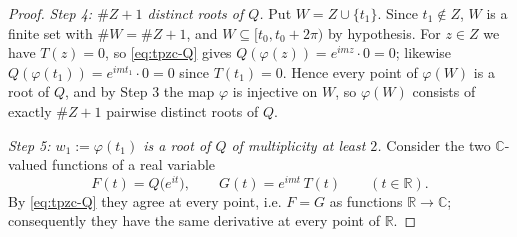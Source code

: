 \begin{proof}
\emph{Step 4: $\#Z+1$ distinct roots of $Q$.} Put $W=Z\cup\{t_1\}$. Since
$t_1\notin Z$, $W$ is a finite set with $\#W=\#Z+1$, and
$W\subseteq[t_0,t_0+2\pi)$ by hypothesis. For $z\in Z$ we have $T(z)=0$, so
\eqref{eq:tpzc-Q} gives $Q(\varphi(z))=e^{imz}\cdot0=0$; likewise
$Q(\varphi(t_1))=e^{imt_1}\cdot0=0$ since $T(t_1)=0$. Hence every point of
$\varphi(W)$ is a root of $Q$, and by Step 3 the map $\varphi$ is injective on
$W$, so $\varphi(W)$ consists of exactly $\#Z+1$ pairwise distinct roots of $Q$.

\emph{Step 5: $w_1:=\varphi(t_1)$ is a root of $Q$ of multiplicity at least
$2$.} Consider the two $\mathbb{C}$-valued functions of a real variable
\[
  F(t)=Q\bigl(e^{it}\bigr),\qquad G(t)=e^{imt}\,T(t)\qquad(t\in\mathbb{R}).
\]
By \eqref{eq:tpzc-Q} they agree at every point, i.e. $F=G$ as functions
$\mathbb{R}\to\mathbb{C}$; consequently they have the same derivative at every
point of $\mathbb{R}$.


\end{proof}
